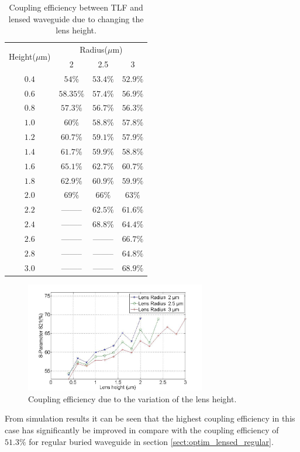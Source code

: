 \begin{table}[!ht]
\caption{Coupling efficiency between TLF and lensed waveguide due to changing the lens height.}
\centering
\begin{tabular}{|c|c|c|c|}
\hline
\multirow{2}{*}{Height($\mu$m)}&\multicolumn{3}{c|}{Radius($\mu$m)}\\
\cline{2-4}
 			&	2&	2.5&	3\\
\hline
$0.4$&$54\%$&$53.4\%$&$52.9\%$\\
$0.6$&$58.35\%$&$57.4\%$&$56.9\%$\\
$0.8$&$57.3\%$&$56.7\%$&$56.3\%$\\
$1.0$&$60\%$&$58.8\%$&$57.8\%$\\
$1.2$&$60.7\%$&$59.1\%$&$57.9\%$\\
$1.4$&$61.7\%$&$59.9\%$&$58.8\%$\\
$1.6$&$65.1\%$&$62.7\%$&$60.7\%$\\
$1.8$&$62.9\%$&$60.9\%$&$59.9\%$\\
$2.0$&$69\%$  &  $66\%$&$63\%$\\
$2.2$&--------&$62.5\%$&$61.6\%$\\
$2.4$&--------&$68.8\%$&$64.4\%$\\
$2.6$&--------&--------&$66.7\%$\\
$2.8$&--------&--------&$64.8\%$\\
$3.0$&--------&--------&$68.9\%$\\
\hline
\end{tabular}
\label{tab:coupling_lensed_waveguide_height}
\end{table}
\begin{figure}[!ht]
\centering
\includegraphics[width=0.7\textwidth]{bilder/s21_fix_lens_radium_hxx}
\caption{Coupling efficiency due to the variation of the lens height.}
\label{fig:coupling_lenses_curve_hxx}
\end{figure}
From simulation results it can be seen that the highest coupling efficiency in this case has significantly be improved in compare with the coupling efficiency of $51.3\%$ for regular buried waveguide in section \ref{sect:optim_lensed_regular}.\\

